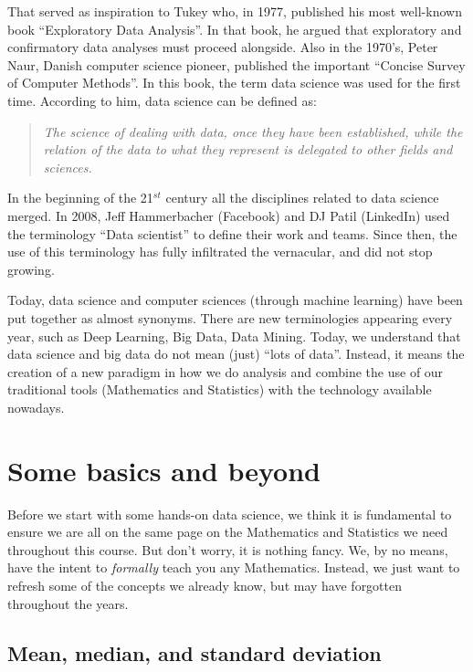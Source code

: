 \documentclass[10pt]{PhDthesisPSnPDF}%
\begin{document}
That served as inspiration to Tukey who, in 1977, published his most well-known book ``Exploratory Data Analysis''. In that book, he argued that exploratory and confirmatory data analyses must proceed alongside. Also in the 1970's, Peter Naur, Danish computer science pioneer, published the important ``Concise Survey of Computer Methods''. In this book, the term data science was used for the first time. According to him, data science can be defined as:
\begin{quotation}
\textit{The science of dealing with data, once they have been established, while the relation of the data to what they represent is delegated to other fields and sciences.}
\end{quotation} 

In the beginning of the 21$^{st}$ century all the disciplines related to data science merged. In 2008, Jeff Hammerbacher (Facebook) and DJ Patil (LinkedIn) used the terminology ``Data scientist'' to define their work and teams. Since then, the use of this terminology has fully infiltrated the vernacular, and did not stop growing. 

Today, data science and computer sciences (through machine learning) have been put together as almost synonyms. There are new terminologies appearing every year, such as Deep Learning, Big Data, Data Mining. Today, we understand that data science and big data do not mean (just) ``lots of data''. Instead, it means the creation of a new paradigm in how we do analysis and combine the use of our traditional tools (Mathematics and Statistics) with the technology available nowadays.

\chapter{Some basics and beyond}\label{basics}

Before we start with some hands-on data science, we think it is fundamental to ensure we are all on the same page on the Mathematics and Statistics we need throughout this course. But don't worry, it is nothing fancy. We, by no means, have the intent to \textit{formally} teach you any Mathematics. Instead, we just want to refresh some of the concepts we already know, but may have forgotten throughout the years.

\section{Mean, median, and standard deviation}
\end{document}
